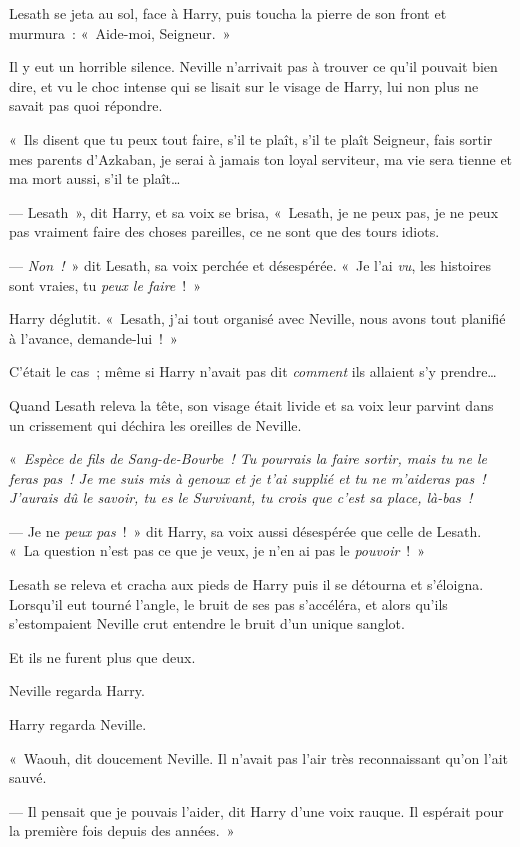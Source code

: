 Lesath se jeta au sol, face à Harry, puis toucha la pierre de son front et murmura~: «~Aide-moi, Seigneur.~»

Il y eut un horrible silence. Neville n'arrivait pas à trouver ce qu'il pouvait bien dire, et vu le choc intense qui se lisait sur le visage de Harry, lui non plus ne savait pas quoi répondre.

«~Ils disent que tu peux tout faire, s'il te plaît, s'il te plaît Seigneur, fais sortir mes parents d'Azkaban, je serai à jamais ton loyal serviteur, ma vie sera tienne et ma mort aussi, s'il te plaît…

--- Lesath~», dit Harry, et sa voix se brisa, «~Lesath, je ne peux pas, je ne peux pas vraiment faire des choses pareilles, ce ne sont que des tours idiots.

--- \emph{Non~!}~» dit Lesath, sa voix perchée et désespérée. «~Je l'ai \emph{vu}, les histoires sont vraies, tu \emph{peux le faire}~!~»

Harry déglutit. «~Lesath, j'ai tout organisé avec Neville, nous avons tout planifié à l'avance, demande-lui~!~»

C'était le cas~; même si Harry n'avait pas dit \emph{comment} ils allaient s'y prendre…

Quand Lesath releva la tête, son visage était livide et sa voix leur parvint dans un crissement qui déchira les oreilles de Neville.

«~\emph{Espèce de fils de Sang-de-Bourbe~! Tu pourrais la faire sortir, mais tu ne le feras pas~! Je me suis mis à genoux et je t'ai supplié et tu ne m'aideras pas~! J'aurais dû le savoir, tu es le Survivant, tu crois que c'est sa place, là-bas~!}

--- Je ne \emph{peux pas}~!~» dit Harry, sa voix aussi désespérée que celle de Lesath. «~La question n'est pas ce que je veux, je n'en ai pas le \emph{pouvoir}~!~»

Lesath se releva et cracha aux pieds de Harry puis il se détourna et s'éloigna. Lorsqu'il eut tourné l'angle, le bruit de ses pas s'accéléra, et alors qu'ils s'estompaient Neville crut entendre le bruit d'un unique sanglot.

Et ils ne furent plus que deux.

Neville regarda Harry.

Harry regarda Neville.

«~Waouh, dit doucement Neville. Il n'avait pas l'air très reconnaissant qu'on l'ait sauvé.

--- Il pensait que je pouvais l'aider, dit Harry d'une voix rauque. Il espérait pour la première fois depuis des années.~»

